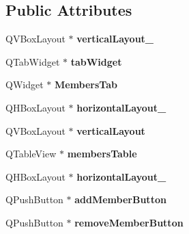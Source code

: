 \subsection*{Public Attributes}
\begin{DoxyCompactItemize}
\item 
\mbox{\label{class_ui___admin_window_ac6ae604a0e1e53ffa0df7ba9e0cf7563}} 
Q\+V\+Box\+Layout $\ast$ {\bfseries vertical\+Layout\+\_}
\item 
\mbox{\label{class_ui___admin_window_a2f61ae137e32be6c7c69db13eb2ced38}} 
Q\+Tab\+Widget $\ast$ {\bfseries tab\+Widget}
\item 
\mbox{\label{class_ui___admin_window_acf3d5d3d8e366f15962780c7830019d2}} 
Q\+Widget $\ast$ {\bfseries Members\+Tab}
\item 
\mbox{\label{class_ui___admin_window_a8e04de9410a29def2275242f4f94b88b}} 
Q\+H\+Box\+Layout $\ast$ {\bfseries horizontal\+Layout\+\_}
\item 
\mbox{\label{class_ui___admin_window_a33486ff8f11715d9bbdb9dd5fa77eb36}} 
Q\+V\+Box\+Layout $\ast$ {\bfseries vertical\+Layout}
\item 
\mbox{\label{class_ui___admin_window_a3e338fb9ba4e065ef64265922e9fdc09}} 
Q\+Table\+View $\ast$ {\bfseries members\+Table}
\item 
\mbox{\label{class_ui___admin_window_a04ded2559805fe42878d03f2f284b031}} 
Q\+H\+Box\+Layout $\ast$ {\bfseries horizontal\+Layout\+\_}
\item 
\mbox{\label{class_ui___admin_window_a35495dc1e3ce72d96f92f35ce2642ae4}} 
Q\+Push\+Button $\ast$ {\bfseries add\+Member\+Button}
\item 
\mbox{\label{class_ui___admin_window_a7d6af77120832ba68335bbe7e3e11ebb}} 
Q\+Push\+Button $\ast$ {\bfseries remove\+Member\+Button}
\item 
\mbox{\label{class_ui___admin_window_a5ddc6f4f3e6e62f1e089ec935c76c1b1}} 

\end{DoxyCompactItemize}
